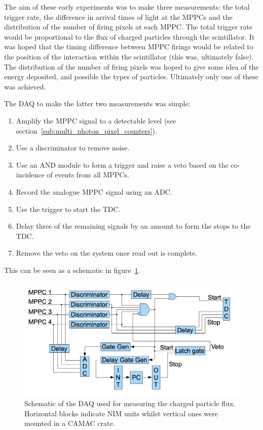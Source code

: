 The aim of these early experiments was to make three measurements: the total trigger rate, the difference in arrival times of light at the MPPCs and the distribution of the number of firing pixels at each MPPC. The total trigger rate would be proportional to the flux of charged particles through the scintillator. It was hoped that the timing difference between MPPC firings would be related to the position of the interaction within the scintillator (this was, ultimately false). The distribution of the number of firing pixels was hoped to give some idea of the energy deposited, and possible the types of particles. Ultimately only one of these was achieved.

The DAQ to make the latter two measurements was simple:
\begin{enumerate}
    \item Amplify the MPPC signal to a detectable level (see section~\ref{sub:multi_photon_pixel_counters}).
    \item Use a discriminator to remove noise.
    \item Use an AND module to form a trigger and raise a veto based on the co-incidence of events from all MPPCs.
    \item Record the analogue MPPC signal using an ADC.
    \item Use the trigger to start the TDC.
    \item Delay three of the remaining signals by an amount to form the stops to the TDC.
    \item Remove the veto on the system once read out is complete.
\end{enumerate}
This can be seen as a schematic in figure~\ref{fig:MuSIC1_DAQ_Block}. 

\begin{figure}[hptb]
    \centering
        \includegraphics[width=.9\textwidth]{images/charged_flux/MuSIC1_DAQ_Block.png}
    \caption{Schematic of the DAQ used for measuring the charged particle flux. Horizontal blocks indicate NIM units whilst vertical ones were mounted in a CAMAC crate.}
    \label{fig:MuSIC1_DAQ_Block}
\end{figure}

